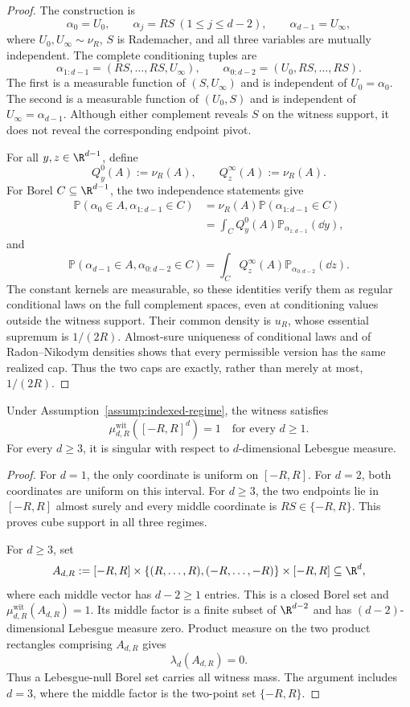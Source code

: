 \begin{proof}
The construction is
\[
\alpha_0=U_0,\qquad
\alpha_j=RS\ (1\leq j\leq d-2),\qquad
\alpha_{d-1}=U_\infty,
\]
where $U_0,U_\infty\sim\nu_R$, $S$ is Rademacher, and all three variables
are mutually independent.  The complete conditioning tuples are
\[
\alpha_{1:d-1}=(RS,\ldots,RS,U_\infty),\qquad
\alpha_{0:d-2}=(U_0,RS,\ldots,RS).
\]
The first is a measurable function of $(S,U_\infty)$ and is independent of
$U_0=\alpha_0$.  The second is a measurable function of $(U_0,S)$ and is
independent of $U_\infty=\alpha_{d-1}$.  Although either complement reveals
$S$ on the witness support, it does not reveal the corresponding endpoint
pivot.

For all $y,z\in\R^{d-1}$, define
\[
Q^0_y(A):=\nu_R(A),\qquad Q^\infty_z(A):=\nu_R(A).
\]
For Borel $C\subseteq\R^{d-1}$, the two independence statements give
\[
\begin{aligned}
\mathbb P(\alpha_0\in A,\alpha_{1:d-1}\in C)
&=\nu_R(A)\mathbb P(\alpha_{1:d-1}\in C)\\
&=\int_CQ^0_y(A)\mathbb P_{\alpha_{1:d-1}}(\dd y),
\end{aligned}
\]
and
\[
\mathbb P(\alpha_{d-1}\in A,\alpha_{0:d-2}\in C)
=\int_CQ^\infty_z(A)\mathbb P_{\alpha_{0:d-2}}(\dd z).
\]
The constant kernels are measurable, so these identities verify them as
regular conditional laws on the full complement spaces, even at conditioning
values outside the witness support.  Their common density is $u_R$, whose
essential supremum is $1/(2R)$.  Almost-sure uniqueness of conditional laws
and of Radon--Nikodym densities shows that every permissible version has the
same realized cap.  Thus the two caps are exactly, rather than merely at
most, $1/(2R)$.
\end{proof}

\begin{proposition}
\label{prop:witness-support-singularity}
Under Assumption~\ref{assump:indexed-regime}, the witness satisfies
\[
\mu^{\mathrm{wit}}_{d,R}([-R,R]^d)=1
\quad\text{for every }d\geq1.
\]
For every $d\geq3$, it is singular with respect to $d$-dimensional Lebesgue
measure.
\end{proposition}

\begin{proof}
For $d=1$, the only coordinate is uniform on $[-R,R]$.  For $d=2$, both
coordinates are uniform on this interval.  For $d\geq3$, the two endpoints
lie in $[-R,R]$ almost surely and every middle coordinate is
$RS\in\{-R,R\}$.  This proves cube support in all three regimes.

For $d\geq3$, set
\[
A_{d,R}:=[-R,R]\times
\{(R,\ldots,R),(-R,\ldots,-R)\}\times[-R,R]\subseteq\R^d,
\]
where each middle vector has $d-2\geq1$ entries.  This is a closed Borel set
and $\mu^{\mathrm{wit}}_{d,R}(A_{d,R})=1$.  Its middle factor is a finite
subset of $\R^{d-2}$ and has $(d-2)$-dimensional Lebesgue measure zero.
Product measure on the two product rectangles comprising $A_{d,R}$ gives
\[
\lambda_d(A_{d,R})=0.
\]
Thus a Lebesgue-null Borel set carries all witness mass.  The argument
includes $d=3$, where the middle factor is the two-point set $\{-R,R\}$.
\end{proof}

